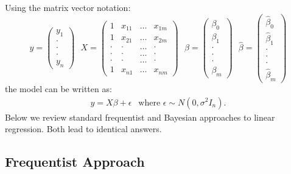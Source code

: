 \documentclass{scrartcl}
\begin{document}
Using the matrix vector notation: 
\begin{equation*}
  y =
  \begin{pmatrix}
    y_1 \\ \cdot \\ \cdot \\ \cdot \\ y_n
  \end{pmatrix} ~~~ X =
  \begin{pmatrix}
    1 & x_{11} & \dots & x_{1m} \\
    1 & x_{21} & \dots & x_{2m} \\
    \cdot & \cdot & \dots & \cdot \\
    \cdot & \cdot & \dots & \cdot \\
    \cdot & \cdot & \dots & \cdot \\
    1 & x_{n1} & \dots & x_{nm}
  \end{pmatrix} ~~~
  \beta =
  \begin{pmatrix}
    \beta_0 \\ \beta_1 \\ \cdot \\ \cdot \\ \cdot \\ \beta_m
  \end{pmatrix} ~~~
  \hat{\beta} =
  \begin{pmatrix}
    \hat{\beta}_0 \\ \hat{\beta}_1 \\ \cdot \\ \cdot \\ \cdot \\ \hat{\beta}_m
  \end{pmatrix}
\end{equation*}
the model can be written as:
\begin{align*}
  y = X \beta + \epsilon ~~ \text{ where } \epsilon \sim N(0, \sigma^2
  I_n). 
\end{align*}
Below we review standard frequentist and Bayesian approaches to linear
regression. Both lead to identical answers. 

\subsection{Frequentist Approach}
\end{document}
